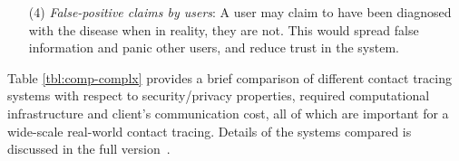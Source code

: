 \documentclass[11pt]{article} %
\newcommand{\remove}[1]{}
\begin{document}
\begin{itemize}
\remove{	This linkage can also be used to track a user's movements via Bluetooth beacons. Bluetooth has protections against tracking users over time introduced in Bluetooth 4.0 Low Energy \cite{bluetooth-privacy}. With solutions such as \cite{google-apple,chan2020pact} it is possible to link previously seen Bluetooth device (MAC) addresses despite these protections via exchanged contact tokens once the seeds used to generate the tokens are released\footnote{As internet users have already pointed out https://twitter.com/moxie/status/1248707315626201088}, producing a similar attack to \cite{bluetooth-tracking}.}
	
	\item[(4)] {\em False-positive claims by users}: A user may claim to have been diagnosed with the disease when in reality, they are not. This would spread false information and panic other users, and reduce trust in the system.
	
\end{itemize}


Table \ref{tbl:comp-complx} provides a brief comparison of different contact tracing systems with respect to security/privacy properties, required computational infrastructure and client's communication cost, all of which are important for a wide-scale real-world contact tracing. Details of the systems compared is discussed in the full version~\cite{epione}.
\end{document}
